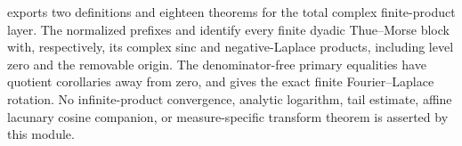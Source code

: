 \documentclass[11pt,oneside]{article}
\theoremstyle{definition}
\theoremstyle{remark}
\newcommand{\1}{\mathbf 1}
\begin{document}
\begin{statusbox}
 exports two definitions and eighteen theorems
for the total complex finite-product layer.  The normalized prefixes
 and  identify every
finite dyadic Thue--Morse block with, respectively, its complex sinc and negative-Laplace
products, including level zero and the removable origin.  The denominator-free primary
equalities have quotient corollaries away from zero, and
 gives the exact
finite Fourier--Laplace rotation.  No infinite-product convergence, analytic logarithm,
tail estimate, affine lacunary cosine companion, or measure-specific transform theorem is
asserted by this module.
\end{statusbox}
\end{document}
